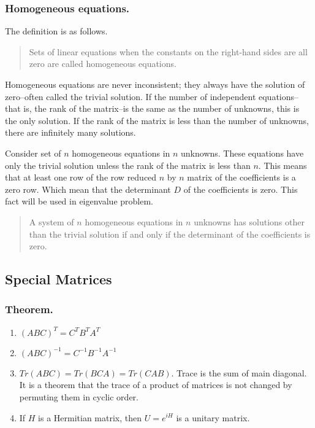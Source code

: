 \documentclass[../main.tex]{subfiles}
\begin{document}
\subsubsection*{Homogeneous equations.} The definition is as follows.

\begin{quote}
	Sets of linear equations when the constants on the right-hand sides are all zero are called homogeneous equations.
\end{quote}

Homogeneous equations are never inconsistent; they always have the solution of zero--often called the trivial solution.
If the number of independent equations--that is, the rank of the matrix--is the same as the number of unknowns, this is the only solution.
If the rank of the matrix is less than the number of unknowns, there are infinitely many solutions.

Consider set of $n$ homogeneous equations in $n$ unknowns.
These equations have only the trivial solution unless the rank of the matrix is less than $n$.
This means that at least one row of the row reduced $n$ by $n$ matrix of the coefficients is a zero row.
Which mean that the determinant $D$ of the coefficients is zero.
This fact will be used in eigenvalue problem.

\begin{quote}
	A system of $n$ homogeneous equations in $n$ unknowns has solutions other than the trivial solution if and only if the determinant of the coefficients is zero.
\end{quote}

\subsection*{Special Matrices}
\subsubsection*{Theorem.}
\begin{enumerate}
	\item $(ABC)^T=C^TB^TA^T$
	\item $(ABC)^{-1}=C^{-1}B^{-1}A^{-1}$
	\item $Tr(ABC)=Tr(BCA)=Tr(CAB)$.  Trace is the sum of main diagonal. It is a theorem that the
	      trace of a product of matrices is not changed by permuting them in cyclic order.
	\item If $H$ is a Hermitian matrix, then $U = e^{iH}$ is a unitary matrix.
\end{enumerate}
\end{document}
